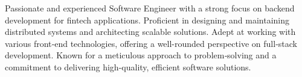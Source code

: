 
\begin{cvparagraph}
	Passionate and experienced Software Engineer with a strong focus on backend development for fintech applications.
	Proficient in designing and maintaining distributed systems and architecting scalable solutions.
	Adept at working with various front‑end technologies, offering a well-rounded perspective on full‑stack development.
	Known for a meticulous approach to problem‑solving and a commitment to delivering high-quality, efficient software solutions.
\end{cvparagraph}
